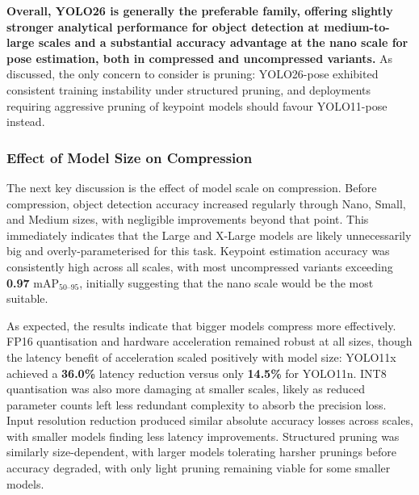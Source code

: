 \textbf{Overall, YOLO26 is generally the preferable family, offering slightly stronger analytical performance for object detection at medium-to-large scales and a substantial accuracy advantage at the nano scale for pose estimation, both in compressed and uncompressed variants.} As discussed, the only concern to consider is pruning: YOLO26-pose exhibited consistent training instability under structured pruning, and deployments requiring aggressive pruning of keypoint models should favour YOLO11-pose instead.

\subsubsection{Effect of Model Size on Compression}

The next key discussion is the effect of model scale on compression. Before compression, object detection accuracy increased regularly through Nano, Small, and Medium sizes, with negligible improvements beyond that point. This immediately indicates that the Large and X-Large models are likely unnecessarily big and overly-parameterised for this task. Keypoint estimation accuracy was consistently high across all scales, with most uncompressed variants exceeding \textbf{0.97} mAP$_{50\text{--}95}$, initially suggesting that the nano scale would be the most suitable. 

As expected, the results indicate that bigger models compress more effectively. FP16 quantisation and hardware acceleration remained robust at all sizes, though the latency benefit of acceleration scaled positively with model size: YOLO11x achieved a \textbf{36.0\%} latency reduction versus only \textbf{14.5\%} for YOLO11n. INT8 quantisation was also more damaging at smaller scales, likely as reduced parameter counts left less redundant complexity to absorb the precision loss. Input resolution reduction produced similar absolute accuracy losses across scales, with smaller models finding less latency improvements. Structured pruning was similarly size-dependent, with larger models tolerating harsher prunings before accuracy degraded, with only light pruning remaining viable for some smaller models.


